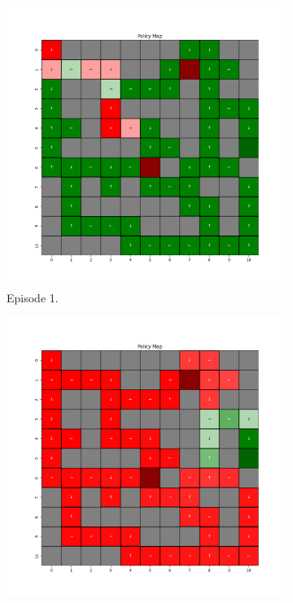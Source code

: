 \documentclass{assignment}
\begin{document}
\begin{figure}[H]
    \begin{subfigure}{0.3\textwidth}
        \includegraphics[width=\textwidth]{figures/policy_q/alpha_sweep/policy_alpha_1_gamma_0.95_epsilon_0.2_iteration_1.png}
    \caption{Episode 1.}
    \end{subfigure}\hfill
    \begin{subfigure}{0.3\textwidth}
        \includegraphics[width=\textwidth]{figures/policy_q/alpha_sweep/policy_alpha_1_gamma_0.95_epsilon_0.2_iteration_50.png}

\end{subfigure}
\end{figure}
\end{document}

